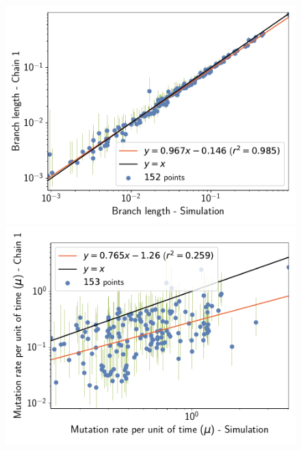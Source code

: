 \documentclass{article}
\begin{document}
	\begin{figure}[H]
		\centering
		\begin{minipage}{0.32\linewidth}
			\includegraphics[width=\linewidth, page=1]{simulations/SimuFold_SiteMutSelBranchNe_BranchCorrelation_Log10BranchLength}
		\end{minipage} \hfill
		\begin{minipage}{0.32\linewidth}
			\includegraphics[width=\linewidth, page=1]{simulations/SimuFold_SiteMutSelBranchNe_BranchCorrelation_LogMutationRatePerTime}
		\end{minipage} \hfill
		\begin{minipage}{0.32\linewidth}

\end{minipage}
\end{figure}
\end{document}
